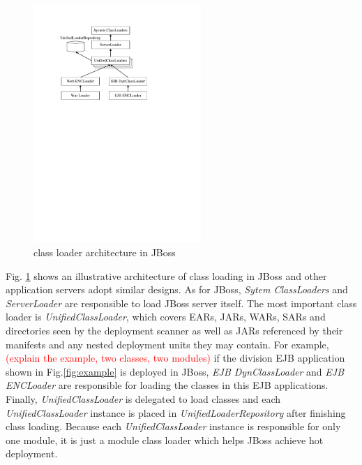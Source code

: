 \documentclass[conference]{IEEEtran}
\begin{document}
\begin{figure}[ht]
\centering
\includegraphics[width=2.5in]{JBossClassLoader.pdf}
\caption{class loader architecture in JBoss}
\label{fig:jboss_class_loader}
\end{figure}

Fig. \ref{fig:jboss_class_loader} shows an illustrative architecture of class loading in JBoss and other application servers adopt similar designs. As for JBoss, \emph{Sytem ClassLoaders} and \emph{ServerLoader} are responsible to load JBoss server itself. The most important class loader is \emph{UnifiedClassLoader}, which covers EARs, JARs, WARs, SARs and directories seen by the deployment scanner as well as JARs referenced by their manifests and any nested deployment units they may contain\cite{jboss_class_loader}. For example, \textcolor{red}{(explain the example, two classes, two modules)} if the division EJB application shown in Fig.\ref{fig:example} is deployed in JBoss, \emph{EJB DynClassLoader} and \emph{EJB ENCLoader} are responsible for loading the classes in this EJB applications. Finally, \emph{UnifiedClassLoader} is delegated to load classes and each \emph{UnifiedClassLoader} instance is placed in \emph{UnifiedLoaderRepository} after finishing class loading. Because each \emph{UnifiedClassLoader} instance is responsible for only one module, it is just a module class loader which helps JBoss achieve hot deployment.
\end{document}
